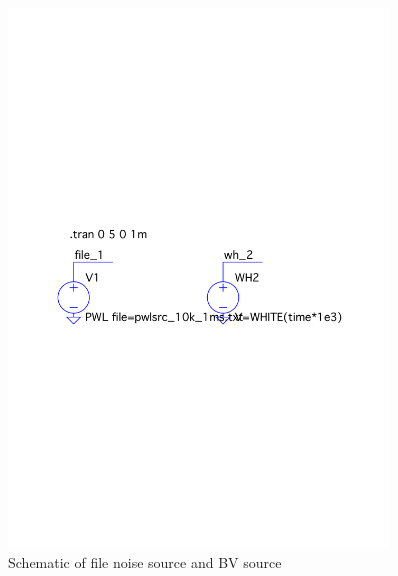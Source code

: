 \documentclass[12pt,a4paper,UKenglish]{article}
\begin{document}
\begin{figure} [H]
  \centering 
  \includegraphics[width=0.9\textwidth]{img/sch_5c.pdf} 
  \caption{Schematic of file noise source and BV source}
  \label{sch_5c} 
\end{figure}
\end{document}
